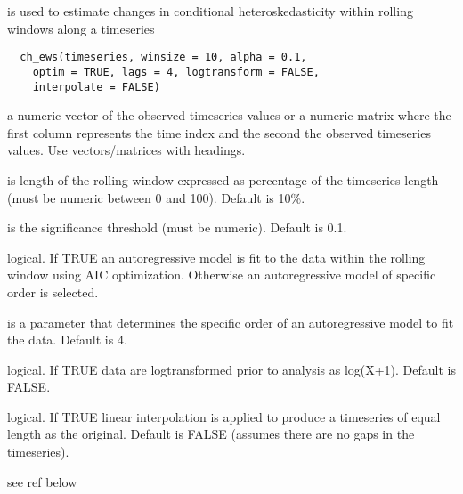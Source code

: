 \documentclass[a4paper]{book}
\begin{document}
%
\begin{Description}\relax
{} is used to estimate changes in conditional
heteroskedasticity within rolling windows along a
timeseries
\end{Description}
%
\begin{Usage}
\begin{verbatim}
  ch_ews(timeseries, winsize = 10, alpha = 0.1,
    optim = TRUE, lags = 4, logtransform = FALSE,
    interpolate = FALSE)
\end{verbatim}
\end{Usage}
%
\begin{Arguments}
\begin{ldescription}
\item[\code{timeseries}] a numeric vector of the observed
timeseries values or a numeric matrix where the first
column represents the time index and the second the
observed timeseries values. Use vectors/matrices with
headings.

\item[\code{winsize}] is length of the rolling window expressed
as percentage of the timeseries length (must be numeric
between 0 and 100). Default is 10\%.

\item[\code{alpha}] is the significance threshold (must be
numeric). Default is 0.1.

\item[\code{optim}] logical. If TRUE an autoregressive model is
fit to the data within the rolling window using AIC
optimization. Otherwise an autoregressive model of
specific order  is selected.

\item[\code{lags}] is a parameter that determines the specific
order of an autoregressive model to fit the data. Default
is 4.

\item[\code{logtransform}] logical. If TRUE data are
logtransformed prior to analysis as log(X+1). Default is
FALSE.

\item[\code{interpolate}] logical. If TRUE linear interpolation
is applied to produce a timeseries of equal length as the
original. Default is FALSE (assumes there are no gaps in
the timeseries).
\end{ldescription}
\end{Arguments}
%
\begin{Details}\relax
see ref below
\end{Details}
\end{document}
